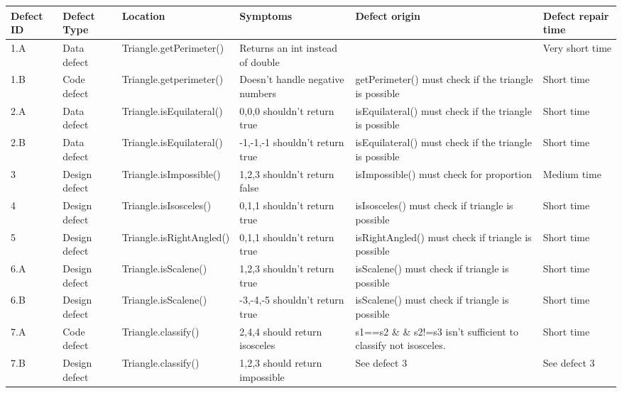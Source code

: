 \begin{table}
\begin{tabular}{|l|l|l|l|l|l|}
\hline  Defect ID & Defect Type   & Location  & Symptoms & Defect origin  & Defect repair time \\ \hline
1.A       & Data defect   & Triangle.getPerimeter()  & Returns an int instead of double & ~																													 & Very short time\\
1.B       & Code defect   & Triangle.getperimeter()  & Doesn't handle negative numbers  & getPerimeter() must check if the triangle is possible & Short time         \\      
2.A       & Data defect   & Triangle.isEquilateral() & 0,0,0 shouldn't return true      & isEquilateral() must check if the triangle is possible       & Short time         \\    
2.B       & Data defect   & Triangle.isEquilateral() & -1,-1,-1 shouldn't return true   & isEquilateral() must check if the triangle is possible       & Short time         \\    
3         & Design defect & Triangle.isImpossible()  & 1,2,3 shouldn't return false     & isImpossible() must check for proportion                     & Medium time        \\    
4         & Design defect & Triangle.isIsosceles()   & 0,1,1 shouldn't return true      & isIsosceles() must check if triangle is possible             & Short time         \\    
5         & Design defect & Triangle.isRightAngled() & 0,1,1 shouldn't return true      & isRightAngled() must check if triangle is possible           & Short time         \\    
6.A       & Design defect & Triangle.isScalene()     & 1,2,3 shouldn't return true      & isScalene() must check if triangle is possible               & Short time         \\    
6.B       & Design defect & Triangle.isScalene()     & -3,-4,-5 shouldn't return true   & isScalene() must check if triangle is possible               & Short time         \\    
7.A       & Code defect   & Triangle.classify()      & 2,4,4 should return isosceles    & s1==s2 \& \& s2!=s3 isn't sufficient to classify not isosceles. & Short time         \\ 
7.B       & Design defect & Triangle.classify()      & 1,2,3 should return impossible   & See defect 3                                                 & See defect 3       \\         \hline     
\end{tabular}
\end{table}